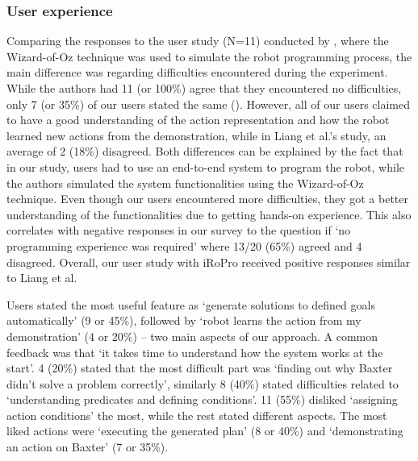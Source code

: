 \subsubsection{User experience} 
Comparing the responses to the user study (N=11) conducted by \citet{liang2017evaluation}, where the Wizard-of-Oz technique was used to simulate the robot programming process, the main difference was regarding difficulties encountered during the experiment.
While the authors had 11 (or 100\%) agree that they encountered no difficulties, only 7 (or 35\%) of our users stated the same ().
However, all of our users claimed to have a good understanding of the action representation and how the robot learned new actions from the demonstration, while in Liang et al.'s study, an average of 2 (18\%) disagreed.
Both differences can be explained by the fact that in our study, users had to use an end-to-end system to program the robot, while the authors simulated the system functionalities using the Wizard-of-Oz technique.
Even though our users encountered more difficulties, they got a better understanding of the functionalities due to getting hands-on experience.
This also correlates with negative responses in our survey to the question if `no programming experience was required' where 13/20 (65\%) agreed and 4 disagreed.
Overall, our user study with iRoPro received positive responses similar to Liang et al.

Users stated the most useful feature as `generate solutions to defined goals automatically' (9 or 45\%), followed by `robot learns the action from my demonstration' (4 or 20\%) -- two main aspects of our approach.
A common feedback was that `it takes time to understand how the system works at the start'.
4 (20\%) stated that the most difficult part was `finding out why Baxter didn't solve a problem correctly', similarly 8 (40\%) stated difficulties related to `understanding predicates and defining conditions'. 
11 (55\%) disliked `assigning action conditions' the most, while the rest stated different aspects.
The most liked actions were `executing the generated plan' (8 or 40\%) and `demonstrating an action on Baxter' (7 or 35\%).

